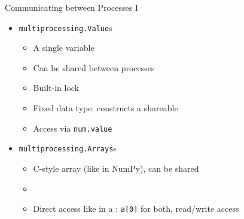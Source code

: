 
\begin{frame}[fragile]{Communicating between Processes I}
%
\begin{itemize}
\item \texttt{multiprocessing.Value}s
	\begin{itemize}
	\item A single variable
	\item Can be shared between processes
	\item Built-in lock
	\item Fixed data type:  constructs a shareable 
	\item Access via \texttt{num.value}
	\end{itemize}
\item \texttt{multiprocessing.Arrays}s
	\begin{itemize}
	\item C-style array (\ie like in NumPy), can be shared
	\item {}
	\item Direct access like in a : \texttt{a[0]} for both, read/write access
	\end{itemize}
\end{itemize}
%
\end{frame}


